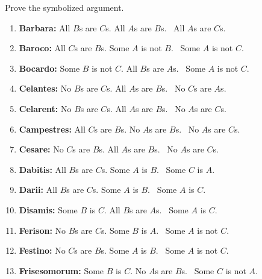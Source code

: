Prove the symbolized argument. 

\problempart \label{pr.BarbaraEtc.proof1} 

\begin{enumerate}[label=\arabic*), topsep=0pt, parsep=0pt, itemsep=3pt]
\item \textbf{Barbara:} All $B$s are $C$s. All $A$s are $B$s.
	\therefore\  All $A$s are $C$s.
\item \textbf{Baroco:} All $C$s are $B$s. Some $A$ is not $B$.
	\therefore\  Some $A$ is not $C$.
\item \textbf{Bocardo:} Some $B$ is not $C$. All $B$s are $A$s.
	\therefore\  Some $A$ is not $C$.
\item\textbf{Celantes:} No $B$s are $C$s. All $A$s are $B$s.
	\therefore\  No $C$s are $A$s.
\item\textbf{Celarent:} No $B$s are $C$s. All $A$s are $B$s.
	\therefore\  No $A$s are $C$s.
\item\textbf{Campestres:} All $C$s are $B$s. No $A$s are $B$s.
	\therefore\  No $A$s are $C$s.
\item\textbf{Cesare:} No $C$s are $B$s. All $A$s are $B$s.
	\therefore\  No $A$s are $C$s.
\item\textbf{Dabitis:} All $B$s are $C$s. Some $A$ is $B$.
	\therefore\  Some $C$ is $A$.
\item\textbf{Darii:} All $B$s are $C$s. Some $A$ is $B$.
	\therefore\  Some $A$ is $C$.
\item\textbf{Disamis:} Some $B$ is $C$. All $B$s are $A$s.
	\therefore\  Some $A$ is $C$.
\item\textbf{Ferison:} No $B$s are $C$s. Some $B$ is $A$.
	\therefore\  Some $A$ is not $C$.
\item\textbf{Festino:} No $C$s are $B$s. Some $A$ is $B$.
	\therefore\  Some $A$ is not $C$.
\item\textbf{Frisesomorum:} Some $B$ is $C$. No $A$s are $B$s.
	\therefore\  Some $C$ is not $A$.
\end{enumerate}


